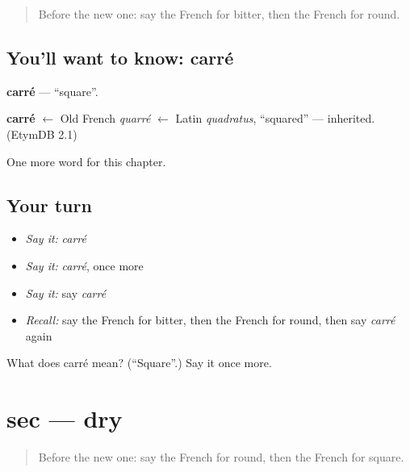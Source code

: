 \label{lesson:FR-C94-carre}



\begin{quote}
Before the new one: say the French for bitter, then the French for round.
\end{quote}

\subsection*{You'll want to know: carré}
\textbf{carré} — \textquotedblleft{}square\textquotedblright{}.

\begin{cousinweb}
\textbf{carré} $\leftarrow$ Old French \emph{quarré} $\leftarrow$ Latin \emph{quadratus}, \textquotedblleft{}squared\textquotedblright{} — inherited. (EtymDB 2.1)
\end{cousinweb}

\begin{grammarlens}[title={What you've built}]
One more word for this chapter.
\end{grammarlens}

\subsection*{Your turn}
\begin{itemize}
\raggedright
  \item \emph{Say it:} \emph{carré}
  \item \emph{Say it:} \emph{carré}, once more
  \item \emph{Say it:} say \emph{carré}
  \item \emph{Recall:} say the French for bitter, then the French for round, then say \emph{carré} again
\end{itemize}

\begin{tcolorbox}[breakable,colback=teal!4,colframe=teal!35!black,title={Before you move on}]
What does carré mean? (\textquotedblleft{}Square\textquotedblright{}.) Say it once more.
\end{tcolorbox}
\section[sec]{sec — dry}

\label{lesson:FR-C94-sec}



\begin{quote}
Before the new one: say the French for round, then the French for square.
\end{quote}

